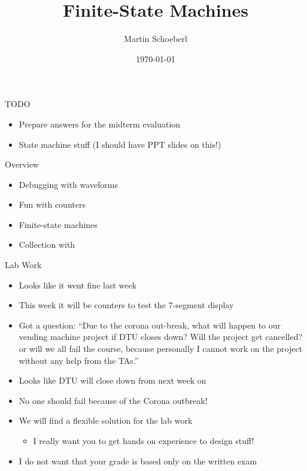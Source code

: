

\newif\ifbook


\title{Finite-State Machines}
\author{Martin Schoeberl}
\date{\today}



\begin{frame}
\titlepage
\end{frame}


\begin{frame}[fragile]{TODO}
\begin{itemize}
\item Prepare answers for the midterm evaluation
\item State machine stuff (I should have PPT slides on this!)
\end{itemize}
\end{frame}

\begin{frame}[fragile]{Overview}
\begin{itemize}
\item Debugging with waveforms
\item Fun with counters
\item Finite-state machines
\item Collection with 
\end{itemize}
\end{frame}

\begin{frame}[fragile]{Lab Work}
\begin{itemize}
\item Looks like it went fine last week
\item This week it will be counters to test the 7-segment display
\item Got a question: ``Due to the corona out-break, what will happen to our vending machine project if DTU closes down? Will the project get cancelled? or will we all fail the course, because personally I cannot work on the project without any help from the TAs.''
\item Looks like DTU will close down from next week on
\item No one should fail because of the Corona outbreak!
\item We will find a flexible solution for the lab work
\begin{itemize}
\item I really want you to get hands on experience to design stuff!
\end{itemize}
\item I do not want that your grade is based only on the written exam
\end{itemize}
\end{frame}

